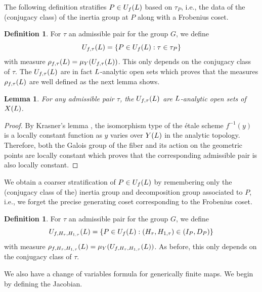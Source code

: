 \documentclass[10pt]{article}
\theoremstyle{plain}
\newtheorem{lemma}[theorem]{Lemma}
\theoremstyle{definition}
\newtheorem{definition}[theorem]{Definition}
\numberwithin{equation}{section}
\begin{document}
The following definition stratifies $P \in U_f({L})$ based on $\tau_P$, i.e., the data of the (conjugacy class) of the inertia group at $P$ along with a Frobenius coset. 

\begin{definition}\label{defn: rho_f,admissible pair}
For $\tau$ an admissible pair for the group $G$, we define
\[U_{f,\tau}({L}) = \{P \in U_f({L}) : \tau \in \tau_P\}\]
with measure $\rho_{f,\tau}({L}) = \mu_Y(U_{f,\tau}({L}))$. This only depends on the conjugacy class of $\tau$. The $U_{f,\tau}({L})$ are in fact ${L}$-analytic open sets which proves that the measures $\rho_{f,\tau}({L})$ are well defined as the next lemma shows.
\end{definition}

\begin{lemma}
For any admissible pair $\tau$, the $U_{f,\tau}({L})$ are ${L}$-analytic open sets of $X({L})$.
\end{lemma}
\begin{proof}
By Krasner's lemma \cite[Proposition 3.5.74]{poonen2017rational}, the isomorphism type of the \'etale scheme $f^{-1}(y)$ is a locally constant function as $y$ varies over $Y({L})$ in the analytic topology. Therefore, both the Galois group of the fiber and its action on the geometric points are locally constant which proves that the corresponding admissible pair is also locally constant.
\end{proof}


We obtain a coarser stratification of $P \in U_f({L})$ by remembering only the (conjugacy class of the) inertia group and decomposition group associated to $P$, i.e., we forget the precise generating coset corresponding to the Frobenius coset.

\begin{definition}\label{defn: rho_f,decomp,inertia}
For $\tau$ an admissible pair for the group $G$, we define
\[U_{f,H_\tau, H_{1,\tau}}({L}) = \{P \in U_f({L}) : (H_\tau,H_{1,\tau}) \in (I_P,D_P)\}\]
with measure $\rho_{f,H_\tau, H_{1,\tau}}({L}) = \mu_Y(U_{f,H_\tau, H_{1,\tau}}({L}))$. As before, this only depends on the conjugacy class of $\tau$.
\end{definition}

We also have a change of variables formula for generically finite maps. We begin by defining the Jacobian.
\end{document}
